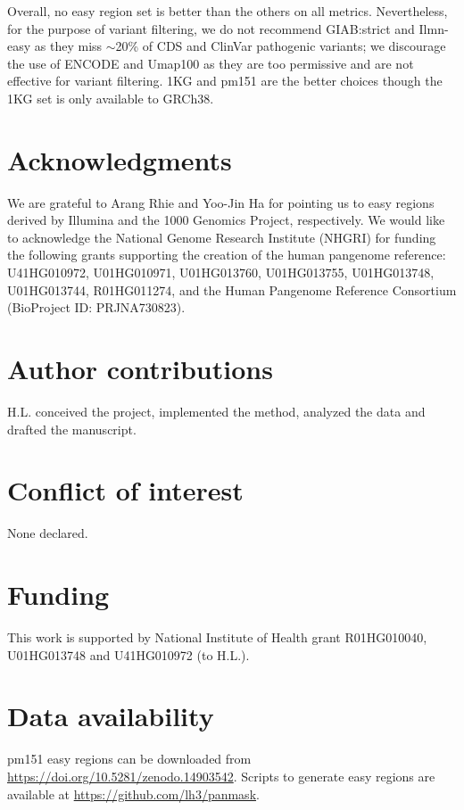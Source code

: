 \documentclass[webpdf,contemporary,large,namedate]{oup-authoring-template}%
\begin{document}
Overall, no easy region set is better than the others on all metrics.
Nevertheless, for the purpose of variant filtering,
we do not recommend GIAB:strict and Ilmn-easy as they miss $\sim$20\% of CDS and ClinVar pathogenic variants;
we discourage the use of ENCODE and Umap100 as they are too permissive
and are not effective for variant filtering.
1KG and pm151 are the better choices
though the 1KG set is only available to GRCh38.

\section*{Acknowledgments}

We are grateful to Arang Rhie and Yoo-Jin Ha for pointing us to easy regions
derived by Illumina and the 1000 Genomics Project, respectively.
We would like to acknowledge the National Genome Research Institute (NHGRI) for
funding the following grants supporting the creation of the human pangenome
reference: U41HG010972, U01HG010971, U01HG013760, U01HG013755, U01HG013748,
U01HG013744, R01HG011274, and the Human Pangenome Reference Consortium
(BioProject ID: PRJNA730823).

\section*{Author contributions}

H.L. conceived the project, implemented the method, analyzed the data and drafted the manuscript.

\section*{Conflict of interest}

None declared.

\section*{Funding}

This work is supported by National Institute of Health grant R01HG010040, U01HG013748 and U41HG010972 (to H.L.).

\section*{Data availability}

pm151 easy regions can be downloaded from \url{https://doi.org/10.5281/zenodo.14903542}. Scripts to generate easy regions are available at \url{https://github.com/lh3/panmask}.


{\sffamily\small
}
\end{document}
